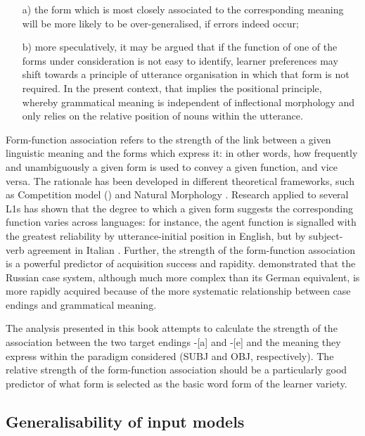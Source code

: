 \begin{enumerate}
\item[a)] the form which is most closely associated to the corresponding meaning will be more likely to be over-generalised, if errors indeed occur;
\item[b)] more speculatively, it may be argued that if the function of one of the forms under consideration is not easy to identify, learner preferences may shift towards a principle of utterance organisation in which that form is not required. In the present context, that implies the positional principle, whereby grammatical meaning is independent of inflectional morphology and only relies on the relative position of nouns within the utterance.
\end{enumerate}

Form-function association refers to the strength of the link between a given linguistic meaning and the forms which express it: in other words, how frequently and unambiguously a given form is used to convey a given function, and vice versa. The rationale has been developed in different theoretical frameworks, such as Competition model (\citealt{MacWhinneyBates1987}) and Natural Morphology \citep{Dressler1987}. Research applied to several L1s has shown that the degree to which a given form suggests the corresponding function varies across languages: for instance, the agent function is signalled with the greatest reliability by ut\-ter\-ance-initial position in English, but by subject-verb agreement in Italian \citep{MacWhinneyEtAl1984}. Further, the strength of the form-function association is a powerful predictor of acquisition success and rapidity. \citet{KempeMacWhinney1998} demonstrated that the Russian case system, although much more complex than its German equivalent, is more rapidly acquired because of the more systematic relationship between case endings and grammatical meaning.

The analysis presented in this book attempts to calculate the strength of the association between the two target endings -[a] and -[e] and the meaning they express within the paradigm considered (SUBJ and OBJ, respectively). The relative strength of the form-function association should be a particularly good predictor of what form is selected as the basic word form of the learner variety.

\subsection{Generalisability of input models}\label{sec:01:4.2}

